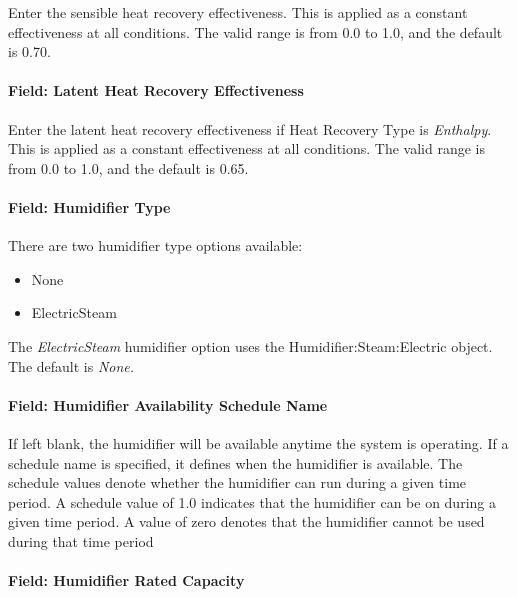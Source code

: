 Enter the sensible heat recovery effectiveness. This is applied as a constant effectiveness at all conditions. The valid range is from 0.0 to 1.0, and the default is 0.70.

\paragraph{Field: Latent Heat Recovery Effectiveness}\label{field-latent-heat-recovery-effectiveness-2}

Enter the latent heat recovery effectiveness if Heat Recovery Type is \emph{Enthalpy}. This is applied as a constant effectiveness at all conditions. The valid range is from 0.0 to 1.0, and the default is 0.65.

\paragraph{Field: Humidifier Type}\label{field-humidifier-type-1}

There are two humidifier type options available:

\begin{itemize}
\item
  None
\item
  ElectricSteam
\end{itemize}

The \emph{ElectricSteam} humidifier option uses the Humidifier:Steam:Electric object. The default is \emph{None.}

\paragraph{Field: Humidifier Availability Schedule Name}\label{field-humidifier-availability-schedule-name-1}

If left blank, the humidifier will be available anytime the system is operating. If a schedule name is specified, it defines when the humidifier is available. The schedule values denote whether the humidifier can run during a given time period. A schedule value of 1.0 indicates that the humidifier can be on during a given time period. A value of zero denotes that the humidifier cannot be used during that time period

\paragraph{Field: Humidifier Rated Capacity}\label{field-humidifier-rated-capacity-1}

